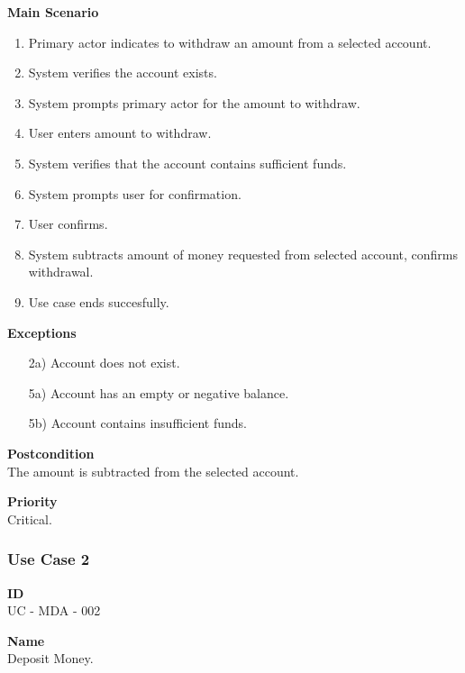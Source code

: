 \documentclass[12pt]{article}
\begin{document}
\noindent
{\bf Main Scenario}\\
\vspace*{-0.2in}
\begin{enumerate}
  \item Primary actor indicates to withdraw an amount from a selected account.
  \item System verifies the account exists.
  \item System prompts primary actor for the amount to withdraw.
  \item User enters amount to withdraw.
  \item System verifies that the account contains sufficient funds.
  \item System prompts user for confirmation.
  \item User confirms.
  \item System subtracts amount of money requested from selected account, confirms withdrawal.
  \item Use case ends succesfully.
\end{enumerate}

\noindent
    {\bf Exceptions}\\
    \vspace*{-0.2in}
\begin{itemize}
    \item[2a)] Account does not exist.
    \item[5a)] Account has an empty or negative balance.
    \item[5b)] Account contains insufficient funds.
\end{itemize}
    

\noindent
{\bf Postcondition}\\
The amount is subtracted from the selected account.

\noindent
{\bf Priority}\\
Critical.   


\subsubsection{Use Case 2} \label{uc:2}

\noindent
{\bf ID}\\
UC - MDA - 002

\noindent
{\bf Name}\\
Deposit Money.
\end{document}
